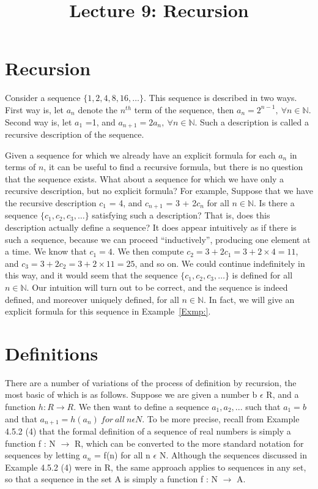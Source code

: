 \documentclass[a4paper,english,12pt]{article}
\title{Lecture 9: Recursion}
\author{}
\begin{document}
\maketitle
\section{Recursion}
Consider a sequence $\{1, 2, 4, 8, 16, \ldots\}$. This sequence is described in two ways. First way is, let $a_n$ denote the $n^{th}$ term of the sequence, then $a_n=2^{n-1},~ \forall n\in \mathbb{N}$. Second way is, let $a_1$ =1, and $a_{n+1}=2a_n,~ \forall n\in \mathbb{N}$. Such a description is called a recursive description of the sequence.

Given a sequence for which we already have an explicit formula for each $a_n$ in terms of $n$, it can be useful to find a recursive formula, but there is no question that the sequence exists. What about a sequence for which we have only a recursive description, but no explicit formula?
For example, Suppose that we have the recursive description $c_1$ = 4, and $c_{n+1}$ = 3 + 2$c_n$ for all $n \in \mathbb{N}$. Is there a sequence $\{c_1, c_2, c_3, \ldots \}$ satisfying such a description? That is, does this description actually define a sequence? It does appear intuitively as if there is such a sequence, because we can proceed “inductively”, producing one element at a time. We know that $c_1 = 4$. We then compute $c_2 = 3 + 2 c_1 = 3 + 2 \times 4 = 11$, and $c_3 = 3 + 2c_2 = 3 + 2 \times 11 = 25$, and so on. We could continue indefinitely in this way, and it would seem that the sequence $\{c_1, c_2, c_3, \ldots \}$ is defined for all $n \in \mathbb{N}$. Our intuition will turn out to be correct, and the sequence is indeed defined, and moreover uniquely defined, for all $n \in \mathbb{N}$. In fact, we will give an explicit formula for this sequence in Example~\ref{Exmp:}.

\section{Definitions}
There are a number of variations of the process of definition by recursion, the most basic of which is as follows. Suppose we are given a number b $\epsilon$ R, and a function $h:R\rightarrow R$. We then want to define a sequence $a_1,a_2, ...$ such that $a_1=b$ and that $a_{n+1}=h(a_n)~for ~all~  n \epsilon N$. To be more precise, recall from Example 4.5.2 (4) that the formal definition of a sequence of real numbers is simply a function f : N $\rightarrow$ R, which can be converted to the more standard notation for sequences by letting $a_n$ = f(n) for all n $\epsilon$ N. Although the sequences discussed in Example 4.5.2 (4) were in R, the same approach applies to sequences in any set, so that a sequence in the set A is simply a function f : N $\rightarrow$ A.
\end{document}
